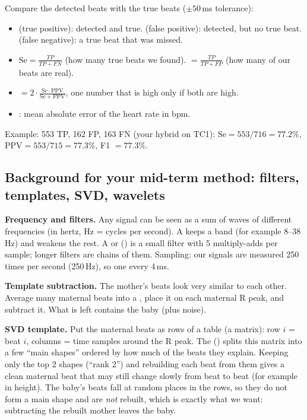 \documentclass[11pt]{article}
\begin{document}
Compare the detected beats with the true beats ($\pm 50$\,ms tolerance):
\begin{itemize}
  \item {} (true positive): detected and true.  (false positive): detected, but no true beat.  (false negative): a true beat that was missed.
  \item {} $\mathrm{Se} = \frac{TP}{TP+FN}$ (how many true beats we found).  $= \frac{TP}{TP+FP}$ (how many of our beats are real).
  \item {} $= 2\cdot\frac{\mathrm{Se}\cdot\mathrm{PPV}}{\mathrm{Se}+\mathrm{PPV}}$, one number that is high only if both are high.
  \item {}: mean absolute error of the heart rate in bpm.
\end{itemize}
Example: 553 TP, 162 FP, 163 FN (your hybrid on TC1): $\mathrm{Se}=553/716=77.2\%$, $\mathrm{PPV}=553/715=77.3\%$, F1 $=77.3\%$.

\subsection{Background for your mid-term method: filters, templates, SVD, wavelets}

\textbf{Frequency and filters.} Any signal can be seen as a sum of waves of different frequencies (in hertz, Hz = cycles per second). A  keeps a band (for example 8--38\,Hz) and weakens the rest. A  or  () is a small filter with 5 multiply-adds per sample; longer filters are chains of them. Sampling: our signals are measured 250 times per second (250\,Hz), so one  every 4\,ms.

\textbf{Template subtraction.} The mother's beats look very similar to each other. Average many maternal beats into a , place it on each maternal R peak, and subtract it. What is left contains the baby (plus noise).

\textbf{SVD template.} Put the maternal beats as rows of a table (a matrix): row $i$ = beat $i$, columns = time samples around the R peak. The  () splits this matrix into a few ``main shapes'' ordered by how much of the beats they explain. Keeping only the top 2 shapes (``rank 2'') and rebuilding each beat from them gives a clean maternal beat that may still change slowly from beat to beat (for example in height). The baby's beats fall at random places in the rows, so they do not form a main shape and are \emph{not} rebuilt, which is exactly what we want: subtracting the rebuilt mother leaves the baby.
\end{document}
